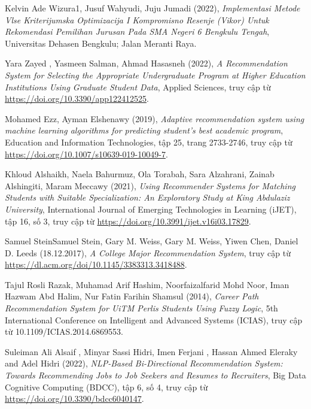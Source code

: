 \begin{thebibliography}{99}
    Kelvin Ade Wizura1, Jusuf Wahyudi, Juju Jumadi (2022),
    \emph{Implementasi Metode Vlse Kriterijumska Optimizacija I Kompromisno Resenje (Vikor) Untuk Rekomendasi Pemilihan Jurusan Pada SMA Negeri 6 Bengkulu Tengah},
    Universitas Dehasen Bengkulu; Jalan Meranti Raya.

    Yara Zayed , Yasmeen Salman, Ahmad Hasasneh (2022),
    \emph{A Recommendation System for Selecting the Appropriate Undergraduate Program at Higher Education Institutions Using Graduate Student Data},
    Applied Sciences,
    truy cập từ \href{https://doi.org/10.3390/app122412525}{\color{black}https://doi.org/10.3390/app122412525}.

    Mohamed Ezz, Ayman Elshenawy (2019),
    \emph{Adaptive recommendation system using machine learning algorithms for predicting student’s best academic program},
    Education and Information Technologies,
    tập 25, trang 2733-2746,
    truy cập từ \href{https://doi.org/10.1007/s10639-019-10049-7}{\color{black}https://doi.org/10.1007/s10639-019-10049-7}.

    Khloud Alshaikh, Naela Bahurmuz, Ola Torabah, Sara Alzahrani, Zainab Alshingiti, Maram Meccawy (2021),
    \emph{Using Recommender Systems for Matching Students with Suitable Specialization: An Exploratory Study at King Abdulaziz University},
    International Journal of Emerging Technologies in Learning (iJET),
    tập 16, số 3,
    truy cập từ \href{https://doi.org/10.3991/ijet.v16i03.17829}{\color{black}https://doi.org/10.3991/ijet.v16i03.17829}.

    Samuel SteinSamuel Stein, Gary M. Weiss, Gary M. Weiss, Yiwen Chen, Daniel D. Leeds (18.12.2017),
    \emph{A College Major Recommendation System},
    truy cập từ \href{https://dl.acm.org/doi/10.1145/3383313.3418488}{\color{black}https://dl.acm.org/doi/10.1145/3383313.3418488}.

    Tajul Rosli Razak, Muhamad Arif Hashim, Noorfaizalfarid Mohd Noor, Iman Hazwam Abd Halim, Nur Fatin Farihin Shamsul (2014),
    \emph{Career Path Recommendation System for UiTM Perlis Students Using Fuzzy Logic},
    5th International Conference on Intelligent and Advanced Systems (ICIAS),
    truy cập từ 10.1109/ICIAS.2014.6869553.

    Suleiman Ali Alsaif , Minyar Sassi Hidri, Imen Ferjani , Hassan Ahmed Eleraky and Adel Hidri (2022),
    \emph{NLP-Based Bi-Directional Recommendation System: Towards Recommending Jobs to Job Seekers and Resumes to Recruiters},
    Big Data Cognitive Computing (BDCC),
    tập 6, số 4,
    truy cập từ \href{https://doi.org/10.3390/bdcc6040147}{\color{black}https://doi.org/10.3390/bdcc6040147}.


\end{thebibliography}
